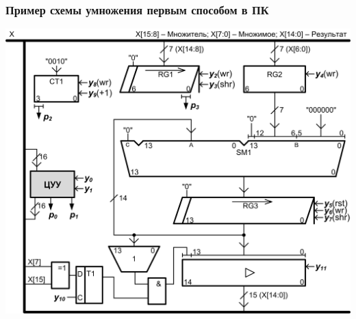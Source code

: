 \begin{frame}
    \frametitle{Пример схемы умножения первым способом в ПК}
    \begin{center}
        \includegraphics[height=.85\textheight]{fig/mulPCI}
    \end{center}
\end{frame}

